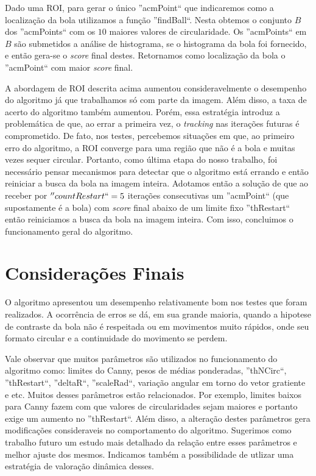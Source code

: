 \documentclass[11pt,a4paper]{article}
\begin{document}
 Dado uma ROI, para gerar o único ''acmPoint`` que indicaremos como a localização da bola utilizamos a função ''findBall``. Nesta obtemos o conjunto $B$ dos ''acmPoints`` com os $10$ maiores valores de circularidade. Os ''acmPoints`` em $B$ são submetidos a análise de histograma, se o histograma da bola foi fornecido, e então gera-se o \textit{score} final destes. Retornamos como localização da bola o ''acmPoint`` com maior \textit{score} final.

 A abordagem de ROI descrita acima aumentou consideravelmente o desempenho do algoritmo já que trabalhamos só com parte da imagem. Além disso, a taxa de acerto do algoritmo também aumentou. Porém, essa estratégia introduz a problemática de que, ao errar a primeira vez, o \textit{tracking} nas iterações futuras é comprometido. De fato, nos testes, percebemos situações em que, ao primeiro erro do algoritmo, a ROI converge para uma região que não é a bola e muitas vezes sequer circular. Portanto, como última etapa do nosso trabalho, foi necessário pensar mecanismos para detectar que o algoritmo está errando e então reiniciar a busca da bola na imagem inteira. Adotamos então a solução de que ao receber por $''countRestart``=5$ iterações consecutivas um ''acmPoint`` (que supostamente é a bola) com \textit{score} final abaixo de um limite fixo ''thRestart`` então reiniciamos a busca da bola na imagem inteira. Com isso, concluimos o funcionamento geral do algoritmo.


\section{Considerações Finais}
 O algoritmo apresentou um desempenho relativamente bom nos testes que foram realizados. A ocorrência de erros se dá, em sua grande maioria, quando a hipotese de contraste da bola não é respeitada ou em movimentos muito rápidos, onde seu formato circular e a continuidade do movimento se perdem.

 Vale observar que muitos parâmetros são utilizados no funcionamento do algoritmo como: limites do Canny, pesos de médias ponderadas, ''thNCirc``, ''thRestart``, ''deltaR``, ''scaleRad``, variação angular em torno do vetor gratiente e etc. Muitos desses parâmetros estão relacionados. Por exemplo, limites baixos para Canny fazem com que valores de circularidades sejam maiores e portanto exige um aumento no ''thRestart``. Além disso, a alteração destes parâmetros gera modificações consideraveis no comportamento do algoritmo. Sugerimos como trabalho futuro um estudo mais detalhado da relação entre esses parâmetros e melhor ajuste dos mesmos. Indicamos também a possibilidade de utlizar uma estratégia de valoração dinâmica desses.
\end{document}
